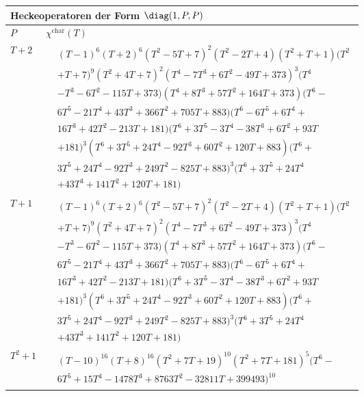 \begin{tabular}{| l | l |}
\multicolumn{2}{l}{\bf Heckeoperatoren der Form $\diag(1,P,P)$} \\
\hline
$P$ & $\chi^\text{char}(T)$ \\
\hline
$T + 2$ &
$\!\begin{aligned}
	&(T - 1)^{6}(T + 2)^{6}(T^{2} - 5T + 7)^{2}(T^{2} - 2T + 4)(T^{2} + T + 1)(T^{2} \\&
+ T + 7)^{9}(T^{2} + 4T + 7)^{2}(T^{4} - 7T^{3} + 6T^{2} - 49T + 373)^{3}(T^{4} \\&
- T^{3} - 6T^{2} - 115T + 373)(T^{4} + 8T^{3} + 57T^{2} + 164T + 373)(T^{6} - \\&
6T^{5} - 21T^{4} + 43T^{3} + 366T^{2} + 705T + 883)(T^{6} - 6T^{5} + 6T^{4} + \\&
16T^{3} + 42T^{2} - 213T + 181)(T^{6} + 3T^{5} - 3T^{4} - 38T^{3} + 6T^{2} + 93T\\&
+ 181)^{3}(T^{6} + 3T^{5} + 24T^{4} - 92T^{3} + 60T^{2} + 120T + 883)(T^{6} + \\&
3T^{5} + 24T^{4} - 92T^{3} + 249T^{2} - 825T + 883)^{3}(T^{6} + 3T^{5} + 24T^{4}\\&
+ 43T^{3} + 141T^{2} + 120T + 181)\end{aligned}$ \\
\hline
$T + 1$ &
$\!\begin{aligned}
	&(T - 1)^{6}(T + 2)^{6}(T^{2} - 5T + 7)^{2}(T^{2} - 2T + 4)(T^{2} + T + 1)(T^{2} \\&
+ T + 7)^{9}(T^{2} + 4T + 7)^{2}(T^{4} - 7T^{3} + 6T^{2} - 49T + 373)^{3}(T^{4} \\&
- T^{3} - 6T^{2} - 115T + 373)(T^{4} + 8T^{3} + 57T^{2} + 164T + 373)(T^{6} - \\&
6T^{5} - 21T^{4} + 43T^{3} + 366T^{2} + 705T + 883)(T^{6} - 6T^{5} + 6T^{4} + \\&
16T^{3} + 42T^{2} - 213T + 181)(T^{6} + 3T^{5} - 3T^{4} - 38T^{3} + 6T^{2} + 93T\\&
+ 181)^{3}(T^{6} + 3T^{5} + 24T^{4} - 92T^{3} + 60T^{2} + 120T + 883)(T^{6} + \\&
3T^{5} + 24T^{4} - 92T^{3} + 249T^{2} - 825T + 883)^{3}(T^{6} + 3T^{5} + 24T^{4}\\&
+ 43T^{3} + 141T^{2} + 120T + 181)\end{aligned}$ \\
\hline
$T^2 + 1$ &
$\!\begin{aligned}
	&(T - 10)^{16}(T + 8)^{16}(T^{2} + 7T + 19)^{10}(T^{2} + 7T + 181)^{5}(T^{6} - \\&
6T^{5} + 15T^{4} - 1478T^{3} + 8763T^{2} - 32811T + 399493)^{10}\end{aligned}$ \\

\end{tabular}

